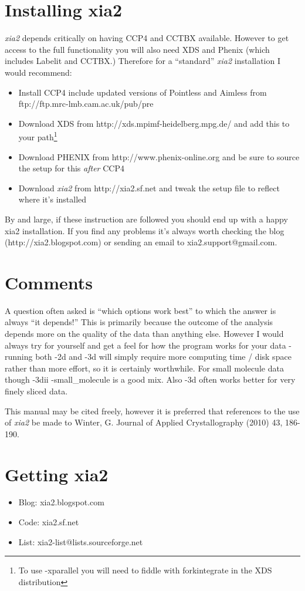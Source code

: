 \documentclass[a4paper, 11pt]{article}
\begin{document}
\section{Installing xia2}

\emph{xia2} depends critically on having CCP4 and CCTBX
available. However to get access to the full functionality you will
also need XDS and Phenix (which includes Labelit and CCTBX.) Therefore
for a ``standard'' \emph{xia2} installation I would recommend:

\begin{itemize}
\item{Install CCP4 include updated versions of Pointless and Aimless
    from ftp://ftp.mrc-lmb.cam.ac.uk/pub/pre}
\item{Download XDS from http://xds.mpimf-heidelberg.mpg.de/ and
    add this to your path\footnote{To use -xparallel you will need to
      fiddle with forkintegrate in the XDS distribution}}
\item{Download PHENIX from http://www.phenix-online.org and be sure to
    source the setup for this \emph{after} CCP4}
\item{Download \emph{xia2} from http://xia2.sf.net and tweak the setup
    file to reflect where it's installed}
\end{itemize}

\noindent
By and large, if these instruction are followed you should end up with
a happy xia2 installation. If you find any problems it's always worth
checking the blog (http://xia2.blogspot.com) or sending an email to
xia2.support@gmail.com.

\section{Comments}

A question often asked is ``which options work best'' to which the
answer is always ``it depends!'' This is primarily because the outcome of
the analysis depends more on the quality of the data than anything
else. However I would always try for yourself and get a feel for how
the program works for your data - running both -2d and -3d will simply
require more computing time / disk space rather than more effort, so
it is certainly worthwhile. For small molecule data though -3dii
-small\_molecule is a good mix. Also -3d often works better for very
finely sliced data.

This manual may be cited freely, however it is preferred that references
to the use of \emph{xia2} be made to Winter, G. Journal of
Applied Crystallography (2010) 43, 186-190.

\section{Getting xia2}
\begin{itemize}
\item{Blog: xia2.blogspot.com}
\item{Code: xia2.sf.net}
\item{List: xia2-list@lists.sourceforge.net}
\end{itemize}
\end{document}
